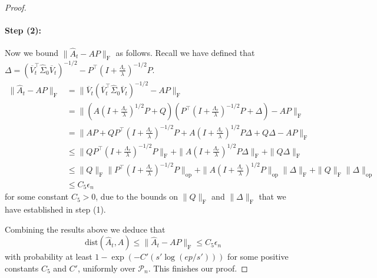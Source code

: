 \documentclass[11pt]{article}
\newcommand{\nb}[1]{\textcolor{orange}{\texttt{[#1]}}}
\newcommand{\festimate}{\widehat{A}_t}
\newcommand{\gd}{\overline{V}}
\newcommand{\dist}{\mathrm{dist}}
\newcommand{\so}{\widehat{\Sigma}_0}
\newcommand{\0}{{\mathbf{0}}}
\newcommand{\op}{{\mathrm{op}}}
\begin{document}
\begin{proof}
\paragraph{Step (2):} Now we bound $\|\festimate-AP\|_\mathrm{F}$ as follows. Recall we have defined that $\Delta=(\gd_t^\top\so\gd_t)^{-1/2}-P^\top(I+\frac{\Lambda_r}{\lambda})^{-1/2}P$. \begin{align*}
\|\festimate-AP\|_\mathrm{F}&=\|\gd_t(\gd_t^\top\so\gd_t)^{-1/2}-AP\|_\mathrm{F}\\
&=\|(A(I+\frac{\Lambda_r}{\lambda})^{1/2}P+Q)(P^\top(I+\frac{\Lambda_r}{\lambda})^{-1/2}P+\Delta)-AP\|_\mathrm{F}\\
&=\|AP+QP^\top(I+\frac{\Lambda_r}{\lambda})^{-1/2}P+A(I+\frac{\Lambda_r}{\lambda})^{1/2}P\Delta+Q\Delta-AP\|_\mathrm{F}\\
&\leq \|QP^\top(I+\frac{\Lambda_r}{\lambda})^{-1/2}P\|_\mathrm{F}+\|A(I+\frac{\Lambda_r}{\lambda})^{1/2}P\Delta\|_\mathrm{F}+\|Q\Delta\|_\mathrm{F}\\
&\leq \|Q\|_\mathrm{F}\|P^\top(I+\frac{\Lambda_r}{\lambda})^{-1/2}P\|_\op+\|A(I+\frac{\Lambda_r}{\lambda})^{1/2}P\|_\op\|\Delta\|_\mathrm{F}+\|Q\|_\mathrm{F}\|\Delta\|_\op\\
&\leq C_5 \epsilon_n
\end{align*}
for some constant $C_5>0$, due to the bounds on $\|Q\|_{\mathrm{F}}$ and $\|\Delta\|_\mathrm{F}$ that we have established in step (1). 

Combining the results above we deduce that 
\begin{equation*}
\dist(\festimate,A)\leq \|\festimate-AP\|_\mathrm{F}\leq C_5\epsilon_n
\end{equation*}
 with probability at least $1-\exp(-C'(s'\log(ep/s')))$ for some positive constants $C_5$ and $C'$, {  uniformly over $\mathcal{P}_n$}.  
 This finishes our proof.
\end{proof}

\end{document}
